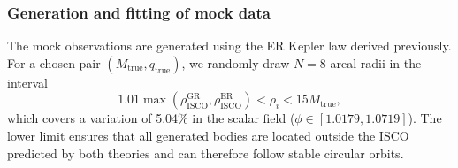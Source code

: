 \documentclass[floats,floatfix,aps, preprintnumbers,nofootinbib]{revtex4-2}
\newcommand{\bracket}[1]{\left[ #1 \right]}
\newcommand{\mrm}{\mathrm}
\begin{document}
\subsubsection{Generation and fitting of mock data}

The mock observations are generated using the ER Kepler law derived previously. For a chosen pair $(M_{\mrm{true}},q_{\mrm{true}})$, we randomly draw $N=8$ areal radii in the interval
\begin{equation}
1.01\max\left(\rho_{\mrm{ISCO}}^{\mrm{GR}}, \rho_{\mrm{ISCO}}^{\mrm{ER}}\right) <\rho_i<15M_{\mrm{true}},
\end{equation}
which covers a variation of 5.04\% in the scalar field ($\phi\in \bracket{1.0179, 1.0719}$). The lower limit ensures that all generated bodies are located outside the ISCO predicted by both theories and can therefore follow stable circular orbits.
\end{document}
